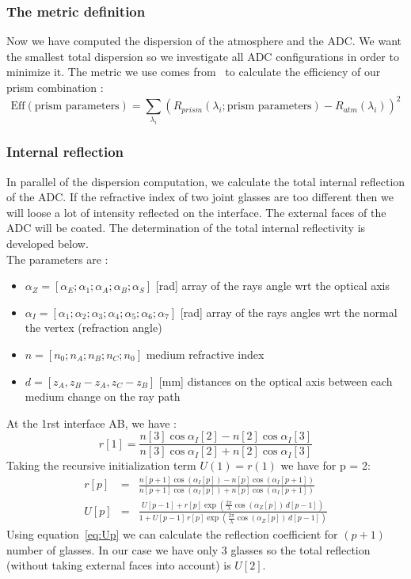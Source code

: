 \subsubsection{The metric definition}
Now we have computed the dispersion of the atmosphere and the ADC. We want the smallest total dispersion so we investigate all ADC configurations in order to minimize it. The metric we use comes from~\cite{Tendulkar} to calculate the efficiency of our prism combination :
\begin{equation}
	\text{Eff}\left(\text{prism parameters}\right) = \sum_{\lambda_i}\left(R_{prism}\left(\lambda_i;\text{prism parameters}\right) - R_{atm}\left(\lambda_i\right)\right)^2
\end{equation}


\subsubsection{Internal reflection}
In parallel of the dispersion computation, we calculate the total internal reflection of the ADC. If the refractive index of two joint glasses are too different then we will loose a lot of intensity reflected on the interface. The external faces of the ADC will be coated. The determination of the total internal reflectivity is developed below.\\
The parameters are :
\begin{itemize}
	\item $\alpha_Z = [\alpha_E;\alpha_1;\alpha_A;\alpha_B;\alpha_S]$ [rad] array of the rays angle wrt the optical axis
	\item $\alpha_I = [\alpha_1;\alpha_2;\alpha_3;\alpha_4;\alpha_5;\alpha_6;\alpha_7]$ [rad] array of the rays angles wrt the normal the vertex (refraction angle)
	\item $n = [n_0;n_A;n_B;n_C;n_0]$ medium refractive index
	\item $d = [z_A,z_B-z_A,z_C-z_B]$ [mm] distances on the optical axis between each medium change on the ray path
\end{itemize}

At the 1rst interface AB, we have :
\begin{equation}
	r[1] = \frac{n[3]\cos\alpha_I[2]-n[2]\cos\alpha_I[3]}{n[3]\cos\alpha_I[2]+n[2]\cos\alpha_I[3]}
\end{equation}
Taking the recursive initialization term $U(1) = r(1)$ we have for p = 2:\\
\begin{eqnarray}
	r[p] &= &\frac{n[p+1]\cos\left(\alpha_I[p]\right)-n[p]\cos\left(\alpha_I[p+1]\right)}{n[p+1]\cos\left(\alpha_I[p]\right)+n[p]\cos\left(\alpha_I[p+1]\right)}\\
	U[p] &= &\frac{U[p-1]+r[p]\exp\left(\frac{2\pi}{\lambda}\cos\left(\alpha_Z[p]\right)\,d[p-1]\right)}{1+U[p-1]\,r[p]\exp\left(\frac{2\pi}{\lambda}\cos\left(\alpha_Z[p]\right)\,d[p-1]\right)}\label{eq:Up}
\end{eqnarray}
Using equation~\eqref{eq:Up} we can calculate the reflection coefficient for $(p+1)$ number of glasses. In our case we have only 3 glasses so the total reflection (without taking external faces into account) is $U[2]$.

